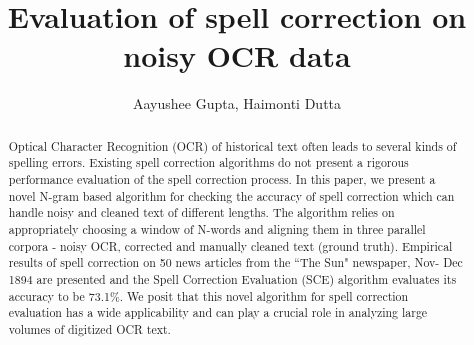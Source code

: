 \documentclass[preprint,11pt]{elsarticle}
\begin{document}
\begin{frontmatter}



\title{Evaluation of spell correction on noisy OCR data}


\author{Aayushee Gupta, Haimonti Dutta}

\address{}



\begin{abstract}
Optical Character Recognition (OCR) of historical text often leads to several kinds of spelling errors. Existing spell correction algorithms do not present a rigorous performance evaluation of the spell correction process. In this paper, we present a novel N-gram based algorithm for checking the accuracy of spell correction which can handle noisy and cleaned text of different lengths. %
The algorithm relies on appropriately choosing a window of N-words and aligning them in three parallel corpora - noisy OCR, corrected and manually cleaned text (ground truth). Empirical results of spell correction on 50 news articles from the ``The Sun" newspaper, Nov- Dec 1894 are presented and the Spell Correction Evaluation (SCE) algorithm evaluates its accuracy to be 73.1\%. We posit that this novel algorithm for spell correction evaluation has a wide applicability and can play a crucial role in analyzing large volumes of digitized OCR text.


\end{abstract}
\end{frontmatter}
\end{document}
